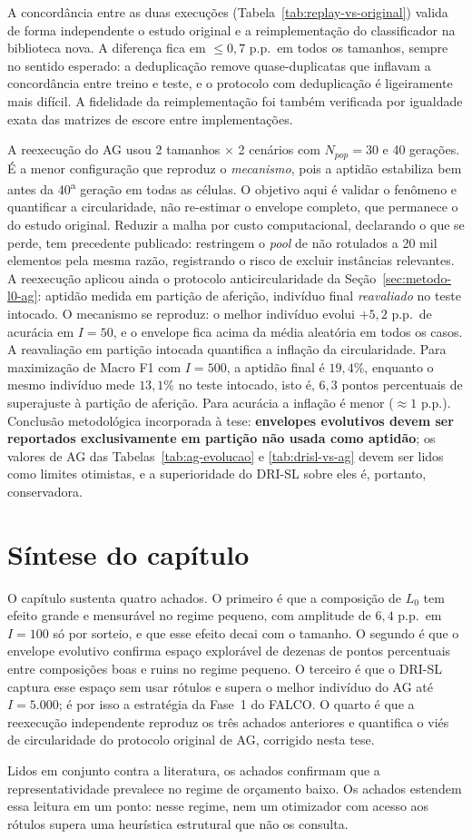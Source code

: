 A concordância entre as duas execuções (Tabela~\ref{tab:replay-vs-original})
valida de forma independente o estudo original e a reimplementação do
classificador na biblioteca nova. A diferença fica em $\le 0{,}7$ p.p.\ em todos os
tamanhos, sempre no sentido esperado: a deduplicação remove quase-duplicatas
que inflavam a concordância entre treino e teste, e o protocolo com
deduplicação é ligeiramente mais difícil. A fidelidade da reimplementação foi
também verificada por igualdade exata das matrizes de escore entre
implementações.

A reexecução do AG usou 2 tamanhos $\times$ 2 cenários com $N_{pop}=30$ e 40
gerações. É a menor configuração que reproduz o \emph{mecanismo}, pois a
aptidão estabiliza bem antes da 40\textsuperscript{a} geração em todas as
células. O objetivo aqui é validar o fenômeno e quantificar a circularidade,
não re-estimar o envelope completo, que permanece o do estudo original. Reduzir a
malha por custo computacional, declarando o que se perde, tem precedente
publicado: \citet{Griesshaber2020} restringem o \textit{pool} de não
rotulados a 20 mil elementos pela mesma razão, registrando o risco de excluir
instâncias relevantes. A
reexecução aplicou ainda o protocolo anticircularidade da Seção~\ref{sec:metodo-l0-ag}: aptidão
medida em partição de aferição, indivíduo final \emph{reavaliado} no teste
intocado. O mecanismo se reproduz: o melhor indivíduo evolui $+5{,}2$ p.p.\ de acurácia
em $I=50$, e o envelope fica acima da média aleatória em todos os casos. A
reavaliação em partição intocada quantifica a inflação da circularidade. Para
maximização de Macro F1 com $I=500$, a aptidão final é $19{,}4\%$, enquanto o
mesmo indivíduo mede $13{,}1\%$ no teste intocado, isto é, $6{,}3$ pontos
percentuais de superajuste à partição de aferição. Para acurácia a inflação é menor ($\approx 1$ p.p.).
Conclusão metodológica incorporada à tese: \textbf{envelopes evolutivos devem
ser reportados exclusivamente em partição não usada como aptidão}; os valores
de AG das Tabelas~\ref{tab:ag-evolucao} e \ref{tab:drisl-vs-ag} devem ser lidos
como limites otimistas, e a superioridade do DRI-SL sobre eles é, portanto,
conservadora.

\section{Síntese do capítulo}
\label{sec:res-l0-sintese}

O capítulo sustenta quatro achados. O primeiro é que a composição de $L_0$
tem efeito grande e mensurável no regime pequeno, com amplitude de $6{,}4$
p.p.\ em $I=100$ só por sorteio, e que esse efeito decai com o tamanho. O
segundo é que o envelope evolutivo confirma espaço explorável de dezenas de
pontos percentuais entre composições boas e ruins no regime pequeno. O
terceiro é que o DRI-SL captura esse espaço sem usar rótulos e supera o
melhor indivíduo do AG até $I=5.000$; é por isso a estratégia da Fase~1 do
FALCO. O quarto é que a reexecução independente reproduz os três achados
anteriores e quantifica o viés de circularidade do protocolo original de AG,
corrigido nesta tese.

Lidos em conjunto contra a literatura, os achados confirmam que a
representatividade prevalece no regime de orçamento baixo. Os achados estendem
essa leitura em um ponto: nesse regime, nem um otimizador com acesso aos
rótulos supera uma heurística estrutural que não os consulta.
